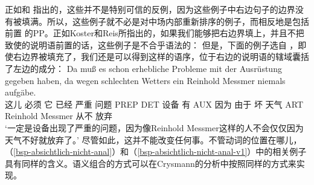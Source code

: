 \begin{enumerate}
{\zl
	正如\citet[Section~6]{Koster75a}和\citet*[]{Reis80a} 指出的，这些并不是特别可信的反例，因为这些例子中右边句子的边界没有被填满。所以，这些例子就不必是对中场内部重新排序的例子，而相反地是包括前置 的PP。正如Koster和Reis所指出的，如果我们能够把右边界填上，并且不把致使的说明语前置的话，这些例子是不合乎语法的：
\eal
{}
\zl
但是，下面的例子选自\citet[]{Crysmann2004a} ，即使右边界被填充了，我们还是可以得到这样的语序，位于右边的说明语的辖域囊括了左边的成分：
\ea
\gll Da muß es schon erhebliche Probleme mit der Ausrüstung gegeben haben, da wegen schlechten
  Wetters ein Reinhold Messmer niemals aufgäbe.\\
  这儿 必须 它 已经 严重 问题 PREP DET 设备 有 AUX 因为 由于 坏 天气 ART Reinhold Messmer 从不
  放弃\\
 \glt `一定是设备出现了严重的问题，因为像Reinhold Messmer这样的人不会仅仅因为天气不好就放弃了。'
\z
尽管如此，这并不能改变任何事。不管动词的位置在哪儿，（\ref{bsp-absichtlich-nicht-anal}）和（\ref{bsp-absichtlich-nicht-anal-v1}）中的相关例子具有同样的含义。语义组合的方式可以在Crysmann的分析中按照同样的方式来实现。
}
\end{enumerate}
